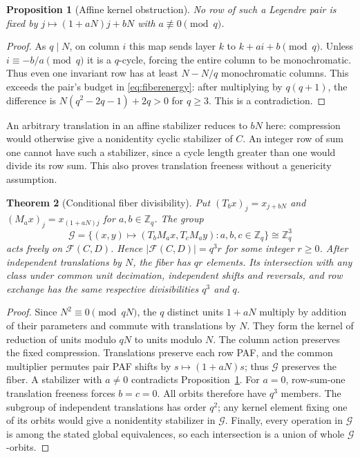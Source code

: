\documentclass[11pt]{article}
\newtheorem{theorem}{Theorem}[section]
\newtheorem{proposition}[theorem]{Proposition}
\newcommand{\Z}{\mathbb Z}
\begin{document}
\begin{proposition}[Affine kernel obstruction]\label{prop:kernel}
No row of such a Legendre pair is fixed by
$j\mapsto(1+aN)j+bN$ with $a\not\equiv0\pmod q$.
\end{proposition}
\begin{proof}
As $q\mid N$, on column $i$ this map sends layer $k$ to
$k+ai+b\pmod q$. Unless $i\equiv-b/a\pmod q$ it is a $q$-cycle,
forcing the entire column to be monochromatic. Thus even one invariant
row has at least $N-N/q$ monochromatic columns. This exceeds the pair's
budget in \eqref{eq:fiberenergy}: after multiplying by $q(q+1)$, the
difference is $N(q^2-2q-1)+2q>0$ for $q\ge3$. This is a contradiction.
\end{proof}
An arbitrary translation in an affine stabilizer reduces to $bN$ here:
compression would otherwise give a nonidentity cyclic stabilizer of $C$.
An integer row of sum one cannot have such a stabilizer, since a cycle
length greater than one would divide its row sum. This also proves
translation freeness without a genericity assumption.

\begin{theorem}[Conditional fiber divisibility]\label{thm:fiber}
Put $(T_bx)_j=x_{j+bN}$ and $(M_ax)_j=x_{(1+aN)j}$ for $a,b\in\Z_q$.
The group
\[
 \mathcal G=\{(x,y)\mapsto(T_bM_ax,T_cM_ay):a,b,c\in\Z_q\}
       \cong\Z_q^3
\]
acts freely on $\mathcal F(C,D)$. Hence $|\mathcal F(C,D)|=q^3r$ for
some integer $r\ge0$. After independent translations by $N$, the fiber
has $qr$ elements. Its intersection with any class under common unit
decimation, independent shifts and reversals, and row exchange has the
same respective divisibilities $q^3$ and $q$.
\end{theorem}
\begin{proof}
Since $N^2\equiv0\pmod{qN}$, the $q$ distinct units $1+aN$ multiply
by addition of their parameters and commute with translations by $N$.
They form the kernel of reduction of units modulo $qN$ to units modulo
$N$. The column action preserves the fixed compression. Translations
preserve each row PAF, and the common multiplier permutes pair PAF shifts
by $s\mapsto(1+aN)s$; thus $\mathcal G$ preserves the fiber.
A stabilizer with $a\ne0$ contradicts Proposition~\ref{prop:kernel}.
For $a=0$, row-sum-one translation freeness forces $b=c=0$.
All orbits therefore have $q^3$ members. The subgroup of independent
translations has order $q^2$; any kernel element fixing one of its orbits
would give a nonidentity stabilizer in $\mathcal G$. Finally, every
operation in $\mathcal G$ is among the stated global equivalences, so
each intersection is a union of whole $\mathcal G$-orbits.
\end{proof}
\end{document}
